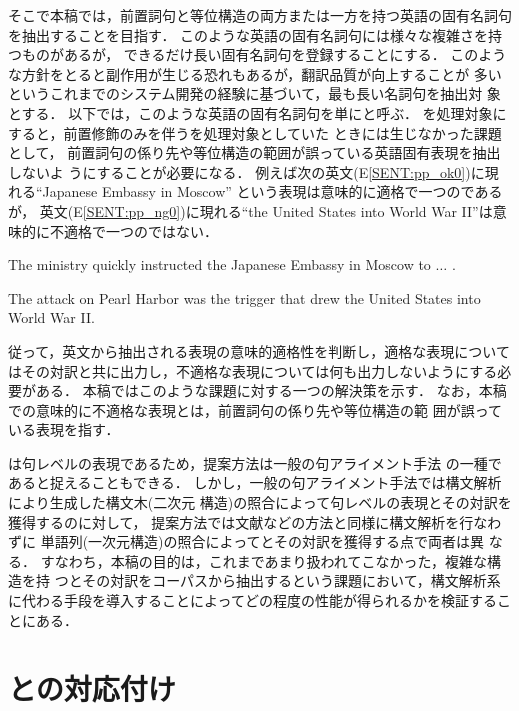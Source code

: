 そこで本稿では，前置詞句と等位構造の両方または一方を持つ英語の固有名詞句
を抽出することを目指す．
このような英語の固有名詞句には様々な複雑さを持つものがあるが，
できるだけ長い固有名詞句を登録することにする．
このような方針をとると副作用が生じる恐れもあるが，翻訳品質が向上することが
多いというこれまでのシステム開発の経験に基づいて，最も長い名詞句を抽出対
象とする．
以下では，このような英語の固有名詞句を単に{\CPNP}と呼ぶ．
{\CPNP}を処理対象にすると，前置修飾のみを伴う{\BPNP}を処理対象としていた
ときには生じなかった課題として，
前置詞句の係り先や等位構造の範囲が誤っている英語固有表現を抽出しないよ
うにすることが必要になる．
例えば次の英文(E\ref{SENT:pp_ok0})に現れる``Japanese Embassy in Moscow''
という表現は意味的に適格で一つの{\CPNP}であるが， 
英文(E\ref{SENT:pp_ng0})に現れる``the United States 
into World War II''は意味的に不適格で一つの{\CPNP}ではない．
\begin{SENT}
\sentE
The ministry quickly instructed the Japanese Embassy in Moscow to 
$\ldots$ .
\label{SENT:pp_ok0}
\end{SENT}
\begin{SENT}
\sentE
The attack on Pearl Harbor was the trigger that drew the United States 
into World War II.
\label{SENT:pp_ng0}
\end{SENT}
従って，英文から抽出される表現の意味的適格性を判断し，適格な表現について
はその対訳と共に出力し，不適格な表現については何も出力しないようにする必
要がある．
本稿ではこのような課題に対する一つの解決策を示す．
なお，本稿での意味的に不適格な表現とは，前置詞句の係り先や等位構造の範
囲が誤っている表現を指す．

{\CPNP}は句レベルの表現であるため，提案方法は一般の句アライメント手法
\cite{Meyers96,Watanabe00,Menezes01,Imamura02,Aramaki03}
の一種であると捉えることもできる．
しかし，一般の句アライメント手法では構文解析により生成した構文木(二次元
構造)の照合によって句レベルの表現とその対訳を獲得するのに対して，
提案方法では文献\cite{Kitamura97}などの方法と同様に構文解析を行なわずに
単語列(一次元構造)の照合によって{\CPNP}とその対訳を獲得する点で両者は異
なる．
すなわち，本稿の目的は，これまであまり扱われてこなかった，複雑な構造を持
つ{\CPNP}とその対訳をコーパスから抽出するという課題において，構文解析系
に代わる手段を導入することによってどの程度の性能が得られるかを検証するこ
とにある．


\section{{\CPNP}と{\JNP}の対応付け}
\label{sec:outline}


